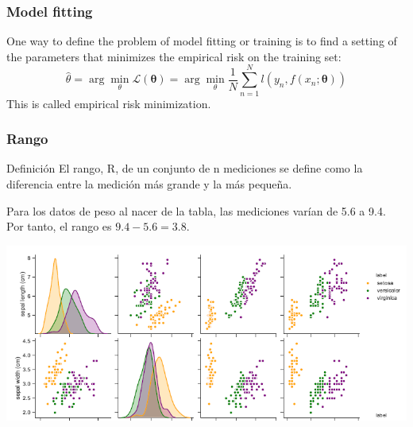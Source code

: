 \documentclass[spanish]{beamer}
\begin{document}
\begin{frame}
\frametitle{Model fitting}
One way to define the problem of model fitting or training is to find a setting of the parameters
that minimizes the empirical risk on the training set:
\begin{equation*}
\hat{\theta} =  \arg\min_{\theta} \mathcal{L}(\mathbf{\theta})  =\arg\min_{\theta} \frac{1}{N} \sum_{n=1}^{N}{l(y_{n}, f(x_{n};\mathbf{\theta})) }
\end{equation*}
This is called empirical risk minimization.
\end{frame}

\begin{frame}
\frametitle{Rango}
\begin{block}{Definición}
El rango, R, de un conjunto de n mediciones se define como la diferencia entre la medición más grande y la más pequeña.
\end{block}
\vspace{1em}

Para los datos de peso al nacer de la tabla, las mediciones varían de 5.6 a 9.4. Por tanto, el rango es $9.4-5.6 =3.8$.
\begin{center}
\includegraphics[scale=0.5]{im4}
\end{center}
\end{frame}
\end{document}

